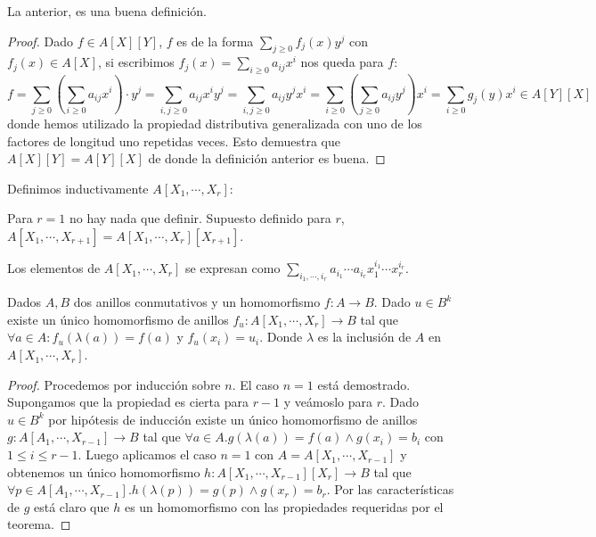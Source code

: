 \begin{proposition}
	La anterior, es una buena definición.
\end{proposition}
\begin{proof}
	Dado $f \in A[X][Y]$, $f$ es de la forma $\sum_{j \ge 0} f_j(x) y^j$ con $f_j(x) \in A[X]$, si escribimos $f_j(x) = \sum_{i \ge 0} a_{ij} x^i$ nos queda para $f$: $$f = \sum_{j \ge 0} (\sum_{i \ge 0} a_{ij} x^i) \cdot y^j = \sum_{i,j \ge 0} a_{ij} x^i y^j = \sum_{i,j \ge 0} a_{ij} y^j x^i = \sum_{i \ge 0} (\sum_{j \ge 0} a_{ij} y^j)x^i = \sum_{i \ge 0} g_j(y) x^i \in A[Y][X]$$ donde hemos utilizado la propiedad distributiva generalizada con uno de los factores de longitud uno repetidas veces. Esto demuestra que $A[X][Y] = A[Y][X]$ de donde la definición anterior es buena. 
\end{proof}

\begin{definition}
	Definimos inductivamente $A[X_1,\cdots,X_r]$:
	
	Para $r = 1$ no hay nada que definir. Supuesto definido para $r$, $A[X_1, \cdots, X_{r+1}] = A[X_1, \cdots, X_r][X_{r+1}]$.
	
	Los elementos de $A[X_1,\cdots,X_r]$ se expresan como $\sum_{i_1,\cdots,i_r} a_{i_1}\cdots a_{i_r} x_1^{i_1} \cdots x_r^{i_r}$.
\end{definition}

\begin{theorem}
	Dados $A,B$ dos anillos conmutativos y un homomorfismo $f: A \to B$. Dado $u \in B^k$ existe un único homomorfismo de anillos $f_u: A[X_1,\cdots,X_r] \to B$ tal que $\forall a \in A:f_u(\lambda(a)) = f(a)$ y $f_u(x_i) = u_i$. Donde $\lambda$ es la inclusión de $A$ en $A[X_1,\cdots,X_r]$. 
	
\end{theorem}
\begin{proof}
	Procedemos por inducción sobre $n$. El caso $n = 1$ está demostrado. Supongamos que la propiedad es cierta para $r-1$ y veámoslo para $r$. Dado $u \in B^k$ por hipótesis de inducción existe un único homomorfismo de anillos $g:A[A_1,\cdots,X_{r-1}] \to B$ tal que $\forall a \in A. g(\lambda(a)) = f(a) \land g(x_i) = b_i$ con $1 \le i \le r-1$. Luego aplicamos el caso $n = 1$ con $A = A[X_1,\cdots,X_{r-1}]$ y obtenemos un único homomorfismo $h:A[X_1,\cdots,X_{r-1}][X_r] \to B$ tal que $\forall p \in A[A_1, \cdots,X_{r-1}]. h(\lambda(p)) = g(p) \land g(x_r) = b_r$. Por las características de $g$ está claro que $h$ es un homomorfismo con las propiedades requeridas por el teorema. 
\end{proof}

